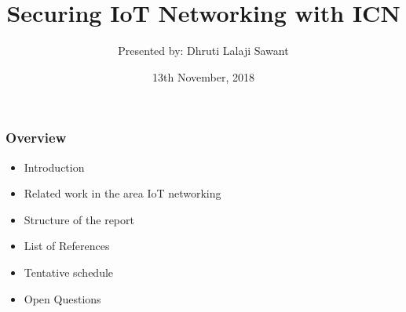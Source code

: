 \documentclass{beamer}
\begin{document}
	\author{Presented by: Dhruti Lalaji Sawant}
	\title{Securing IoT Networking with ICN}
   	\date{13th November, 2018}
\begin{frame}[plain]
\maketitle
\end{frame}

\begin{frame}
\frametitle{Overview}
\begin{itemize}
	\item Introduction
	\item Related work in the area IoT networking
	\item Structure of the report
	\item List of References
	\item Tentative schedule
	\item Open Questions
\end{itemize}
\end{frame}	
\end{document}
